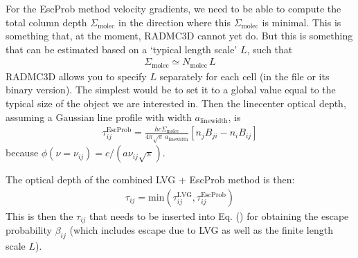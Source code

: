\documentclass[letterpaper,10pt,english]{sphinxmanual}
\begin{document}
For the EscProb method  velocity gradients, we need to be able to
compute the total column depth \(\Sigma_{\mathrm{molec}}\) in the direction
where this \(\Sigma_{\mathrm{molec}}\) is minimal. This is something that,
at the moment, RADMC\sphinxhyphen{}3D cannot yet do. But this is something that can be
estimated based on a ‘typical length scale’ \(L\), such that
\begin{equation*}
\begin{split}\Sigma_{\mathrm{molec}} \simeq N_{\mathrm{molec}}\, L\end{split}
\end{equation*}
RADMC\sphinxhyphen{}3D allows you to specify \(L\) separately for each cell (in the file
 or its binary version). The simplest would be to set
it to a global value equal to the typical size of the object we are interested
in. Then the line\sphinxhyphen{}center optical depth, assuming a Gaussian line profile with
width \(a_{\mathrm{linewidth}}\), is
\begin{equation*}
\begin{split}\tau_{ij}^{\mathrm{EscProb}} = \frac{hc \Sigma_{\mathrm{molec}}}{4\pi\sqrt{\pi}\,a_{\mathrm{linewidth}}}\left[n_jB_{ji}-n_iB_{ij}\right]\end{split}
\end{equation*}
because \(\phi(\nu=\nu_{ij})=c/(a\nu_{ij}\sqrt{\pi})\).

The optical depth of the combined LVG + EscProb method is then:
\begin{equation*}
\begin{split}\tau_{ij} = \mathrm{min}\left(\tau_{ij}^{\mathrm{LVG}},\tau_{ij}^{\mathrm{EscProb}}\right)\end{split}
\end{equation*}
This is then the \(\tau_{ij}\) that needs to be inserted into
Eq. () for obtaining the escape probability
\(\beta_{ij}\) (which includes escape due to LVG as well as the finite
length scale \(L\)).
\end{document}
